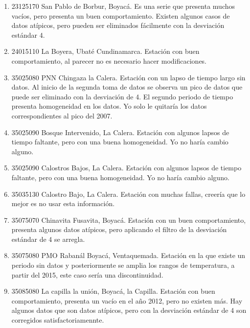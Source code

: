 \documentclass[11pt]{article}
\begin{document}
\begin{enumerate}
\begin{figure}[H]
\begin{subfigure}[b]{0.5\textwidth}
\begin{center}
	\caption{Valores con filtros y desviaciones estándar}
	\label{subfig:c2}
	\end{center}	
	\end{subfigure}
	
	
	
\end{figure}

\item 23125170 San Pablo de Borbur, Boyacá. Es una serie que presenta muchos vacíos, pero presenta un buen comportamiento. Existen algunos casos de datos atípicos, pero pueden ser eliminados fácilmente con la desviación estándar 4.

\item 24015110 La Boyera, Ubaté Cundinamarca. Estación con buen comportamiento, al parecer no es necesario hacer modificaciones.

\item 35025080 PNN Chingaza la Calera. Estación con un lapso de tiempo largo sin datos. Al inicio de la segunda toma de datos se observa un pico de datos que puede ser eliminado con la desviación de 4. El segundo periodo de tiempo presenta homogeneidad en los datos. Yo solo le quitaría los datos correspondientes al pico del 2007.

\item 35025090 Bosque Intervenido, La Calera. Estación con algunos lapsos de tiempo faltante, pero con una buena homogeneidad. Yo no haría cambio alguno.

\item 35025090 Calostros Bajos, La Calera. Estación con algunos lapsos de tiempo faltante, pero con una buena homogeneidad. Yo no haría cambio alguno.

\item 35035130 Calostro Bajo, La Calera. Estación con muchas fallas, creería que lo mejor es no usar esta información.

\item 35075070 Chinavita Fusavita, Boyacá. Estación con un buen comportamiento, presenta algunos datos atípicos, pero aplicando el filtro de la desviación estándar de 4 se arregla.

\item 35075080 PMO  Rabanál Boyacá, Ventaquemada. Estación en la que existe un periodo sin datos y posteriormente se amplia los rangos de temperatura, a partir del 2015, este caso sería una discontinuidad.

\item 35085080 La capilla la unión, Boyacá, la Capilla. Estación con buen comportamiento, presenta un vacío en el año 2012, pero no existen más. Hay algunos datos que son datos atípicos, pero con la desviación estándar de 4 son corregidos satisfactoriamennte.



\end{enumerate}
\end{document}

